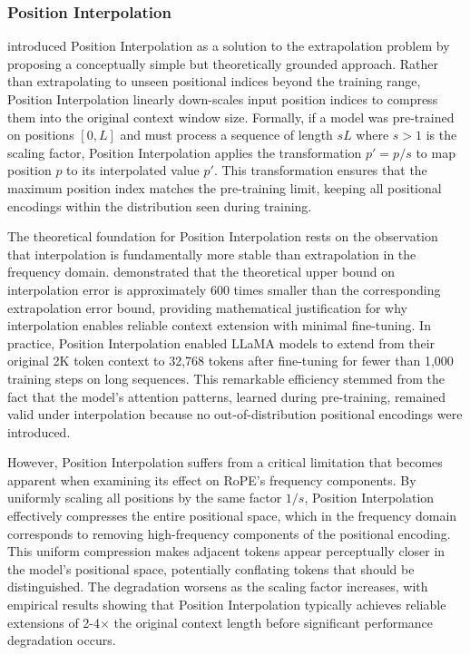 \documentclass[11pt,letterpaper]{article}
\begin{document}
\subsubsection{Position Interpolation}

\cite{chen2023extending} introduced Position Interpolation as a solution to the extrapolation problem by proposing a conceptually simple but theoretically grounded approach. Rather than extrapolating to unseen positional indices beyond the training range, Position Interpolation linearly down-scales input position indices to compress them into the original context window size. Formally, if a model was pre-trained on positions $[0, L]$ and must process a sequence of length $sL$ where $s > 1$ is the scaling factor, Position Interpolation applies the transformation $p' = p/s$ to map position $p$ to its interpolated value $p'$. This transformation ensures that the maximum position index matches the pre-training limit, keeping all positional encodings within the distribution seen during training.

The theoretical foundation for Position Interpolation rests on the observation that interpolation is fundamentally more stable than extrapolation in the frequency domain. \cite{chen2023extending} demonstrated that the theoretical upper bound on interpolation error is approximately 600 times smaller than the corresponding extrapolation error bound, providing mathematical justification for why interpolation enables reliable context extension with minimal fine-tuning. In practice, Position Interpolation enabled LLaMA models to extend from their original 2K token context to 32,768 tokens after fine-tuning for fewer than 1,000 training steps on long sequences. This remarkable efficiency stemmed from the fact that the model's attention patterns, learned during pre-training, remained valid under interpolation because no out-of-distribution positional encodings were introduced.

However, Position Interpolation suffers from a critical limitation that becomes apparent when examining its effect on RoPE's frequency components. By uniformly scaling all positions by the same factor $1/s$, Position Interpolation effectively compresses the entire positional space, which in the frequency domain corresponds to removing high-frequency components of the positional encoding. This uniform compression makes adjacent tokens appear perceptually closer in the model's positional space, potentially conflating tokens that should be distinguished. The degradation worsens as the scaling factor increases, with empirical results showing that Position Interpolation typically achieves reliable extensions of 2-4$\times$ the original context length before significant performance degradation occurs.
\end{document}
